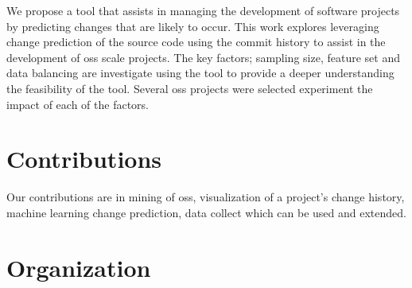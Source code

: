 

We propose a tool that assists in managing the development of software projects by predicting changes that are likely to occur. This work explores leveraging change prediction of the source code using the commit history to assist in the development of \gls{oss} scale projects. The key factors; sampling size, feature set and data balancing are investigate using the tool to provide a deeper understanding the feasibility of the tool. Several \gls{oss} projects were selected experiment the impact of each of the factors.

\section{Contributions}


Our contributions are in mining of \gls{oss}, visualization of a project's change history, machine learning change prediction, data collect which can be used and extended.

\section{Organization}

